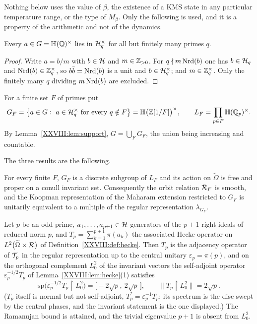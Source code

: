 Nothing below uses the value of $\beta$, the existence of a $\mathrm{KMS}$ state in any particular
temperature range, or the type of $M_\beta$. Only the following is used, and it is a property of
the arithmetic and not of the dynamics.

\begin{lemma}\label{XXVIII:lem:support}
Every $a\in G=\mathbb{H}(\mathbb{Q})^\times$ lies in $\mathcal{H}_q^\times$ for all but finitely many primes $q$.
\end{lemma}

\begin{proof}
Write $a=b/m$ with $b\in\mathcal{H}$ and $m\in\mathbb{Z}_{>0}$. For $q\nmid m\operatorname{Nrd}(b)$ one has $b\in\mathcal{H}_q$ and
$\operatorname{Nrd}(b)\in\mathbb{Z}_q^\times$, so $b\bar b=\operatorname{Nrd}(b)$ is a unit and $b\in\mathcal{H}_q^\times$; and
$m\in\mathbb{Z}_q^\times$. Only the finitely many $q$ dividing $m\operatorname{Nrd}(b)$ are excluded.
\end{proof}

For a finite set $F$ of primes put
\[
G_F=\bigl\{a\in G:\ a\in\cH_q^\times\ \text{for every } q\notin F\bigr\}=\HH\bigl(\Z[1/F]\bigr)^\times,
\qquad L_F=\prod_{p\in F}\HH(\Q_p)^\times .
\]
By Lemma~\ref{XXVIII:lem:support}, $G=\bigcup_FG_F$, the union being increasing and countable.

\medskip
The three results are the following.

\begin{theorem}\label{XXVIII:thm:proper}
For every finite $F$, $G_F$ is a discrete subgroup of $L_F$ and its action on $\widetilde\Omega$
is free and proper on a conull invariant set. Consequently the orbit relation $\mathcal{R}_F$ is smooth,
and the Koopman representation of the Maharam extension restricted to $G_F$ is unitarily
equivalent to a multiple of the regular representation $\lambda_{G_F}$.
\end{theorem}

\begin{theorem}\label{XXVIII:thm:spec}
Let $p$ be an odd prime, $a_1,\dots,a_{p+1}\in\mathcal{H}$ generators of the $p+1$ right ideals of reduced
norm $p$, and $T_p=\sum_{k=1}^{p+1}\pi(a_k)$ the associated Hecke operator on
$L^2\bigl(\widetilde\Omega\times\mathcal{R}\bigr)$ of Definition~\ref{XXVIII:def:hecke}. Then $T_p$ is the
adjacency operator of $\mathcal{T}_p$ in the regular representation up to the central unitary
$\varepsilon_p=\pi(p)$, and on the orthogonal complement
$L^2_0$ of the invariant vectors the self-adjoint operator $\varepsilon_p^{-1/2}T_p$ of
Lemma~\ref{XXVIII:lem:hecke}(1) satisfies
\[
\mathrm{sp}\bigl(\varepsilon_p^{-1/2}T_p\restriction L^2_0\bigr)=\bigl[-2\sqrt p,\ 2\sqrt p\,\bigr],
\qquad \bigl\|T_p\restriction L^2_0\bigr\|=2\sqrt p .
\]
($T_p$ itself is normal but not self-adjoint, $T_p^*=\varepsilon_p^{-1}T_p$; its spectrum is
the disc swept by the central phases, and the invariant statement is the one displayed.)
The Ramanujan bound is attained, and the trivial eigenvalue $p+1$ is absent from $L^2_0$.
\end{theorem}

